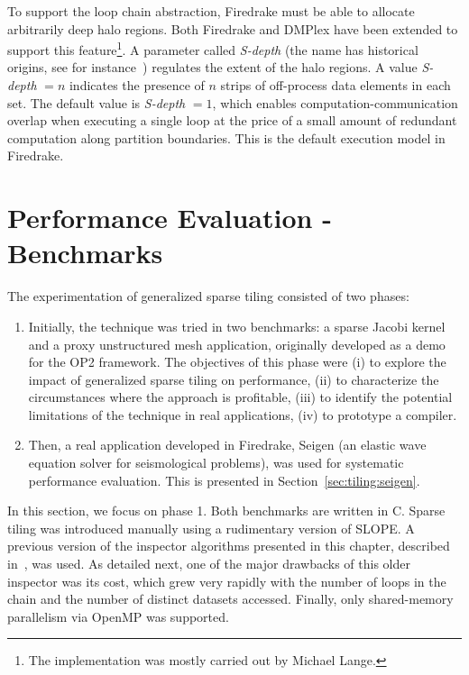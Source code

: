 To support the loop chain abstraction, Firedrake must be able to allocate arbitrarily deep halo regions. Both Firedrake and DMPlex have been extended to support this feature\footnote{The implementation was mostly carried out by Michael Lange.}. A parameter called {\em S-depth} (the name has historical origins, see for instance~\cite{s-depth-paper}) regulates the extent of the halo regions. A value {\em S-depth} $=n$ indicates the presence of $n$ strips of off-process data elements in each set. The default value is {\em S-depth} $=1$, which enables computation-communication overlap when executing a single loop at the price of a small amount of redundant computation along partition boundaries. This is the default execution model in Firedrake.


\section{Performance Evaluation - Benchmarks}
\label{sec:tiling:benchmarks}
The experimentation of generalized sparse tiling consisted of two phases:

\begin{enumerate}
\item Initially, the technique was tried in two benchmarks: a sparse Jacobi kernel and a proxy unstructured mesh application, originally developed as a demo for the OP2 framework. The objectives of this phase were (i) to explore the impact of generalized sparse tiling on performance, (ii) to characterize the circumstances where the approach is profitable, (iii) to identify the potential limitations of the technique in real applications, (iv) to prototype a compiler. 
\item Then, a real application developed in Firedrake, Seigen (an elastic wave equation solver for seismological problems), was used for systematic performance evaluation. This is presented in Section~\ref{sec:tiling:seigen}.
\end{enumerate}

In this section, we focus on phase 1. Both benchmarks are written in C. Sparse tiling was introduced manually using a rudimentary version of SLOPE. A previous version of the inspector algorithms presented in this chapter, described in~\cite{st-paper}, was used. As detailed next, one of the major drawbacks of this older inspector was its cost, which grew very rapidly with the number of loops in the chain and the number of distinct datasets accessed. Finally, only shared-memory parallelism via OpenMP was supported. 


